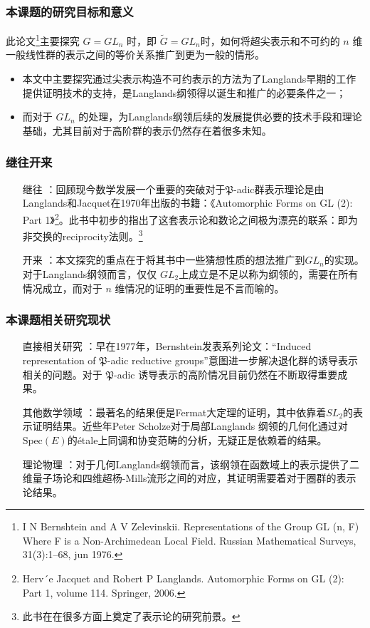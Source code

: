 \documentclass[aspectratio=169]{beamer}
\begin{document}
\begin{frame}
\frametitle{本课题的研究目标和意义}

此论文\cite{Bernshtein_1976}\footnote{I N Bernshtein and A V Zelevinskii.
Representations of the Group GL (n, F) Where F is a
Non-Archimedean Local Field.
Russian Mathematical Surveys, 31(3):1–68, jun 1976.}主要探究 $G=GL_{n}$ 时，即 $\tilde{G}=GL_{n}$时，如何将超尖表示和不可约的 $n$ 维一般线性群的表示之间的等价关系推广到更为一般的情形。
\begin{itemize}
  \item 本文中主要探究通过尖表示构造不可约表示的方法为了Langlands早期的工作提供证明技术的支持，是Langlands纲领得以诞生和推广的必要条件之一；
  \item
而对于 $GL_{n}$ 的处理，为Langlands纲领后续的发展提供必要的技术手段和理论基础，尤其目前对于高阶群的表示仍然存在着很多未知。
\end{itemize}

\end{frame}

\begin{frame}
\frametitle{继往开来}

\begin{itemize}
  \item[继往] ：回顾现今数学发展一个重要的突破对于$\mathfrak{P}$-adic群表示理论是由Langlands和Jacquet在1970年出版的书籍：《Automorphic Forms on GL (2): Part 1》\cite{jacquet2006automorphic}\footnote{Herv´e Jacquet and Robert P Langlands.
Automorphic Forms on GL (2): Part 1, volume 114.
Springer, 2006.}。此书中初步的指出了这套表示论和数论之间极为漂亮的联系：即为非交换的reciprocity法则。\footnote{此书在在很多方面上奠定了表示论的研究前景。}
\item[开来] ：本文探究的重点在于将其书中一些猜想性质的想法推广到$GL_{n}$的实现。对于Langlands纲领而言，仅仅 $GL_{2}$上成立是不足以称为纲领的，需要在所有情况成立，而对于 $n$ 维情况的证明的重要性是不言而喻的。

\end{itemize}

\end{frame}
\begin{frame}
\frametitle{本课题相关研究现状}
\begin{itemize}
  \item[直接相关研究] ：早在1977年，Bernshtein发表系列论文：“Induced representation of $\mathfrak{P}$-adic reductive groups”\cite{ASENS_1977_4_10_4_441_0}意图进一步解决退化群的诱导表示相关的问题。对于 $\mathfrak{P}$-adic 诱导表示的高阶情况目前仍然在不断取得重要成果\cite{Vigneras2017}。
  \item[其他数学领域] ：最著名的结果便是Fermat大定理的证明\cite{wiles1995modular}，其中依靠着$SL_{2}$的表示证明结果。近些年Peter Scholze对于局部Langlands 纲领的几何化通过对$\mathrm{Spec}(E)$的\'{e}tale上同调和协变范畴的分析\cite{wiles1995modular}，无疑正是依赖着\cite{Bernshtein_1976}的结果。
  \item[理论物理] ：对于几何Langlands纲领而言，该纲领在函数域上的表示提供了二维量子场论和四维超杨-Mills流形之间的对应，其证明需要着对于圈群的表示论结果\cite{frenkel2007langlands}。
\end{itemize}

\end{frame}
\end{document}
